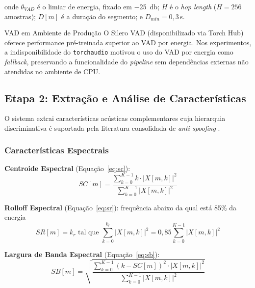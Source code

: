 \documentclass[12pt,a4paper]{article}
\begin{document}
\noindent
onde $\theta_{VAD}$ é o limiar de energia, fixado em \SI{-25}{\decibel};
$H$ é o \textit{hop length} ($H = 256$ amostras); $D[m]$ é a duração do
segmento; e $D_{min} = 0{,}3$\,s.

\begin{infobox}{VAD em Ambiente de Produção}
O Silero VAD (disponibilizado via Torch Hub) oferece performance pré-treinada
superior ao VAD por energia. Nos experimentos, a indisponibilidade do
\texttt{torchaudio} motivou o uso do VAD por energia como \textit{fallback},
preservando a funcionalidade do \textit{pipeline} sem dependências externas não
atendidas no ambiente de CPU.
\end{infobox}

\subsection{Etapa 2: Extração e Análise de Características}

O sistema extrai características acústicas complementares cuja hierarquia
discriminativa é suportada pela literatura consolidada de
\textit{anti-spoofing}
\cite{sahidullah2015comparison, todisco2016new, todisco2019asvspoof}.

\subsubsection{Características Espectrais}

\textbf{Centroide Espectral} (Equação~\ref{eq:sc}):
\begin{equation}
\label{eq:sc}
SC[m] = \frac{\displaystyle\sum_{k=0}^{K-1} k\cdot|X[m,k]|^2}
             {\displaystyle\sum_{k=0}^{K-1}|X[m,k]|^2}
\end{equation}

\textbf{Rolloff Espectral} (Equação~\ref{eq:sr}): frequência abaixo da qual
está 85\% da energia
\begin{equation}
\label{eq:sr}
SR[m] = k_r \text{ tal que }
\sum_{k=0}^{k_r}|X[m,k]|^2 = 0{,}85\sum_{k=0}^{K-1}|X[m,k]|^2
\end{equation}

\textbf{Largura de Banda Espectral} (Equação~\ref{eq:sb}):
\begin{equation}
\label{eq:sb}
SB[m] =
\sqrt{\frac{\displaystyle\sum_{k=0}^{K-1}(k-SC[m])^2\cdot|X[m,k]|^2}
           {\displaystyle\sum_{k=0}^{K-1}|X[m,k]|^2}}
\end{equation}
\end{document}
